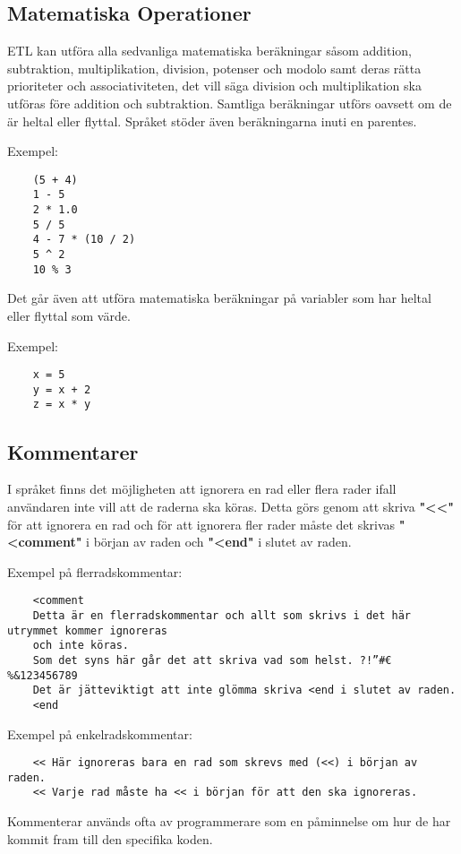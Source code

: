 \documentclass{TDP019mall}
\begin{document}
\subsection{Matematiska Operationer}
ETL kan utföra alla sedvanliga matematiska beräkningar såsom addition, subtraktion, multiplikation, division, potenser och modolo 
samt deras rätta prioriteter och associativiteten, det vill säga division och multiplikation ska utföras före addition och subtraktion. 
Samtliga beräkningar utförs oavsett om de är heltal eller flyttal. Språket stöder även beräkningarna inuti en parentes. 

Exempel:

\begin{verbatim}
    (5 + 4)
    1 - 5
    2 * 1.0
    5 / 5
    4 - 7 * (10 / 2)
    5 ^ 2
    10 % 3
\end{verbatim}

Det går även att utföra matematiska beräkningar på variabler som har heltal eller flyttal som värde. 

Exempel:
\begin{verbatim}
    x = 5
    y = x + 2
    z = x * y
\end{verbatim}

\subsection{Kommentarer}
I språket finns det möjligheten att ignorera en rad eller flera rader ifall användaren inte vill att de raderna ska köras. 
Detta görs genom att skriva \textbf{"<<"} för att ignorera en rad och för att ignorera fler rader måste det skrivas 
\textbf{"<comment"} i början av raden och \textbf{"<end"} i slutet av raden.

Exempel på flerradskommentar:
\begin{verbatim}
    <comment 
    Detta är en flerradskommentar och allt som skrivs i det här utrymmet kommer ignoreras 
    och inte köras. 
    Som det syns här går det att skriva vad som helst. ?!”#€%&123456789
    Det är jätteviktigt att inte glömma skriva <end i slutet av raden.
    <end
\end{verbatim}
 
Exempel på enkelradskommentar:
\begin{verbatim}
    << Här ignoreras bara en rad som skrevs med (<<) i början av raden.
    << Varje rad måste ha << i början för att den ska ignoreras.
\end{verbatim}
 
Kommenterar används ofta av programmerare som en påminnelse om hur de har kommit fram till den specifika koden.
\end{document}
